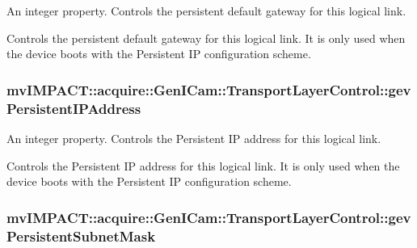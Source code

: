 An integer property. Controls the persistent default gateway for this logical link. 

Controls the persistent default gateway for this logical link. It is only used when the device boots with the Persistent I\+P configuration scheme. \hypertarget{classmv_i_m_p_a_c_t_1_1acquire_1_1_gen_i_cam_1_1_transport_layer_control_a83b97485aff8b1613a8667d96470ee32}{
\subsubsection[{gev\+Persistent\+I\+P\+Address}]{ mv\+I\+M\+P\+A\+C\+T\+::acquire\+::\+Gen\+I\+Cam\+::\+Transport\+Layer\+Control\+::gev\+Persistent\+I\+P\+Address}}\label{classmv_i_m_p_a_c_t_1_1acquire_1_1_gen_i_cam_1_1_transport_layer_control_a83b97485aff8b1613a8667d96470ee32}


An integer property. Controls the Persistent I\+P address for this logical link. 

Controls the Persistent I\+P address for this logical link. It is only used when the device boots with the Persistent I\+P configuration scheme. \hypertarget{classmv_i_m_p_a_c_t_1_1acquire_1_1_gen_i_cam_1_1_transport_layer_control_aaaace291a6f4986f4dd872d9b74102b8}{
\subsubsection[{gev\+Persistent\+Subnet\+Mask}]{ mv\+I\+M\+P\+A\+C\+T\+::acquire\+::\+Gen\+I\+Cam\+::\+Transport\+Layer\+Control\+::gev\+Persistent\+Subnet\+Mask}}\label{classmv_i_m_p_a_c_t_1_1acquire_1_1_gen_i_cam_1_1_transport_layer_control_aaaace291a6f4986f4dd872d9b74102b8}


